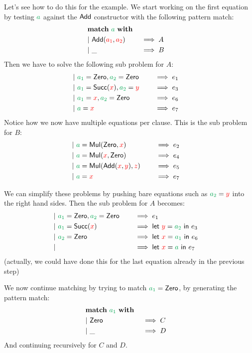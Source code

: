 \documentclass[a4paper, 11pt]{article}
\theoremstyle{definition}
\begin{document}
Let's see how to do this for the example. We start working on the first equation by testing $\ba$ against the $\mathsf{\textcolor{black}{Add}}$ constructor with the following pattern match:
\begin{alignat*}{4}
  \matchwith{\ba} \\
  \clause{\Add(\fvar{a_1}, \fvar{a_2})}{A} \\
  \clause{\_}{B}
\end{alignat*}
Then we have to solve the following sub problem for $A$:
\begin{alignat*}{4}
  \clause{\bvar{a_1} = \Zero, \bvar{a_2} = \Zero}{e_1} \\
  \clause{\bvar{a_1} = \Succ(\fvar x), \bvar{a_2} = \fvar y}{e_3} \\
  \clause{\bvar{a_1} = \fvar x, \bvar{a_2} = \Zero}{e_6} \\
  \clause{\ba = \fvar x}{e_7}
\end{alignat*}
Notice how we now have multiple equations per clause. This is the sub problem for $B$:
\begin{alignat*}{4}
  \clause{\ba = \Mul(\Zero, \fvar{x})}{e_2} \\
  \clause{\ba = \Mul(\fvar x, \Zero)}{e_4} \\
  \clause{\ba = \Mul(\Add(\fvar x, \fvar y), \fvar z)}{e_5} \\
  \clause{\ba = \fvar x}{e_7}
\end{alignat*}

We can simplify these problems by pushing bare equations such as $\bvar{a_2} = \fvar y$ into the right hand sides. Then the sub problem for $A$ becomes:
\begin{alignat*}{4}
  \clause{\bvar{a_1} = \Zero, \bvar{a_2} = \Zero}{e_1} \\
  \clause{\bvar{a_1} = \Succ(\fvar x)}{\lett{\fvar y}{\bvar{a_2}} e_3} \\
  \clause{\bvar{a_2} = \Zero}{\lett{\fvar x}{\bvar{a_1}} e_6} \\
  \clause{}{\lett{\fvar x}{\bvar{a}} e_7}
\end{alignat*}
(actually, we could have done this for the last equation already in the previous step)

We now continue matching by trying to match $\bvar{a_1} = \Zero$, by generating the pattern match:
\begin{alignat*}{4}
  \matchwith{\bvar{a_1}} \\
  \clause{\Zero}{C} \\
  \clause{\_}{D}
\end{alignat*}
And continuing recursively for $C$ and $D$.
\end{document}
